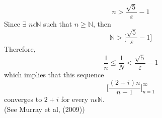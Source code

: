 \documentclass[a4paper, 12pt]{report}
\begin{document}
{\begin{equation*}
n > \frac{\sqrt{5}}{\varepsilon} - 1
\end{equation*}
Since $\exists$ $n \epsilon \mathbb{N}$ such that $n \geq \mathbb{N}$, then
\begin{equation*}
\mathbb{N} > \bigg[\frac{\sqrt{5}}{\varepsilon} - 1\bigg]
\end{equation*}
Therefore,
\begin{equation*}
\frac{1}{n} \leq \frac{1}{N} < \frac{\sqrt{5}}{\varepsilon} - 1
\end{equation*}
which implies that this sequence 
\begin{equation*}
\bigg[\frac{(2 + i)n}{n - 1}\bigg]^\infty_{n=1}
\end{equation*}
converges to $2 + i$ for every $n \epsilon \mathbb{N}$.\\
(See Murray et al, (2009))

}
\end{document}
